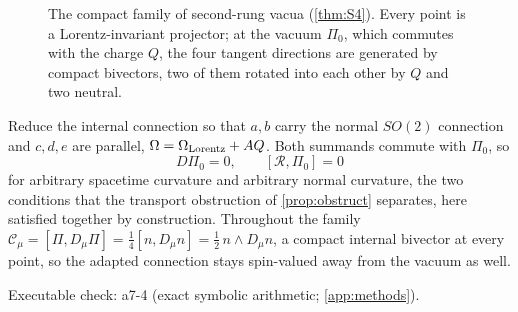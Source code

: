\begin{figure}[t]
\centering
{}
\caption{The compact family of second-rung vacua (\cref{thm:S4}). Every point is a Lorentz-invariant projector; at the vacuum $\Pi_0$, which commutes with the charge $Q$,
the four tangent directions are generated by compact bivectors, two of them rotated into each other by $Q$ and two neutral.}
\label{fig:S4}
\end{figure}

\begin{theorem}
\label{thm:towercurved}
Reduce the internal connection so that $a,b$ carry the normal $SO(2)$ connection and $c,d,e$ are parallel, $\Omega=\Omega_{\rm Lorentz}+AQ$. Both summands commute with
$\Pi_0$, so
\[
D\Pi_0=0,\qquad [\mathcal R,\Pi_0]=0
\]
for arbitrary spacetime curvature and arbitrary normal curvature, the two conditions that the transport obstruction of \cref{prop:obstruct} separates, here satisfied
together by construction. Throughout the family $\mathcal C_\mu=[\Pi,D_\mu\Pi]=\tfrac14[n,D_\mu n]=\tfrac12\,n\wedge D_\mu n$, a compact internal bivector at every point, so the
adapted connection stays spin-valued away from the vacuum as well.
\end{theorem}

\noindent Executable check: a7-4 (exact symbolic arithmetic; \cref{app:methods}).

